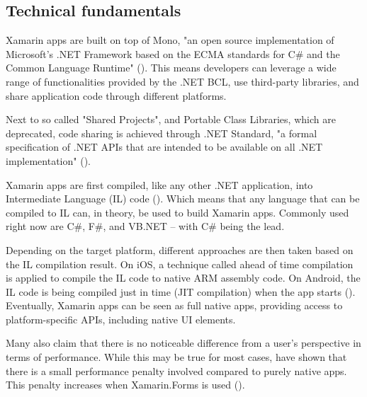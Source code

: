 \subsection{Technical fundamentals}

Xamarin apps are built on top of Mono, "an open source implementation of Microsoft's .NET Framework based on the ECMA standards for C\# and the Common Language Runtime" (\cite{mono_project_cross_2019}). This means developers can leverage a wide range of functionalities provided by the .NET BCL, use third-party libraries, and share application code through different platforms.

Next to so called "Shared Projects", and Portable Class Libraries, which are deprecated, code sharing is achieved through .NET Standard, "a formal specification of .NET APIs that are intended to be available on all .NET implementation" (\cite{microsoft_.net_2019}).

Xamarin apps are first compiled, like any other .NET application, into Intermediate Language (IL) code (\cite{gough_compiling_2001}). Which means that any language that can be compiled to IL can, in theory, be used to build Xamarin apps. Commonly used right now are C\#, F\#, and VB.NET – with C\# being the lead.

Depending on the target platform, different approaches are then taken based on the IL compilation result. On iOS, a technique called ahead of time compilation is applied to compile the IL code to native ARM assembly code. On Android, the IL code is being compiled just in time (JIT compilation) when the app starts (\cite{microsoft_what_2017}). Eventually, Xamarin apps can be seen as full native apps, providing access to platform-specific APIs, including native UI elements.

Many also claim that there is no noticeable difference from a user's perspective in terms of performance. While this may be true for most cases, \cite{willocx_quantitative_2015} have shown that there is a small performance penalty involved compared to purely native apps. This penalty increases when Xamarin.Forms is used (\cite{altexsoft_performance_2017}).
